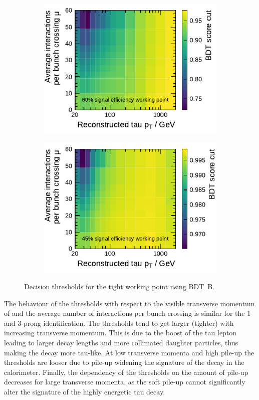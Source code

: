 \begin{figure}[htb]
  \centering
  \begin{subfigure}[t]{0.48\textwidth}
    \centering
    \includegraphics{./figures/bdt_perf/working_points/grid_1p_subsampling0269_wp.pdf}
  \end{subfigure}\hfill
  \begin{subfigure}[t]{0.48\textwidth}
    \centering
    \includegraphics{./figures/bdt_perf/working_points/grid_3p0327_wp.pdf}
  \end{subfigure}
  \caption{Decision thresholds for the tight working point using \mbox{BDT B}.}
  \label{fig:working_point_cutmap}
\end{figure}

The behaviour of the thresholds with respect to the visible transverse momentum
of \tauhadvis and the average number of interactions per bunch crossing is
similar for the 1- and 3-prong identification. The thresholds tend to get larger
(tighter) with increasing transverse momentum. This is due to the boost of the
tau lepton leading to larger decay lengths and more collimated daughter
particles, thus making the decay more tau-like. At low transverse momenta and
high pile-up the thresholds are looser due to pile-up widening the signature of
the decay in the calorimeter. Finally, the dependency of the thresholds on the
amount of pile-up decreases for large transverse momenta, as the soft pile-up
cannot significantly alter the signature of the highly energetic tau decay.

